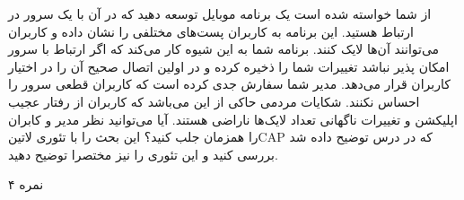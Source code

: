 \documentclass[../main.tex]{subfiles}
\begin{document}

از شما خواسته شده است یک برنامه موبایل توسعه دهید که در آن با یک سرور در ارتباط هستید. این برنامه به کاربران پست‌های مختلفی را نشان داده و کاربران می‌توانند آن‌ها لایک کنند. برنامه شما به این شیوه کار می‌کند که اگر ارتباط با سرور امکان پذیر نباشد تغییرات شما را ذخیره کرده و در اولین اتصال صحیح آن را در اختیار کاربران قرار می‌دهد. مدیر شما سفارش جدی کرده است که کاربران قطعی سرور را احساس نکنند. شکایات مردمی حاکی از این می‌باشد که کاربران از رفتار عجیب اپلیکشن و تغییرات ناگهانی تعداد لایک‌ها ناراضی هستند. آیا می‌توانید نظر مدیر و کابران را همزمان جلب کنید؟ این بحث را با تئوری ‌لاتین{CAP} که در درس توضیح داده شد بررسی کنید و این تئوری را نیز مختصرا توضیح دهید.

۴ نمره
\end{document}
